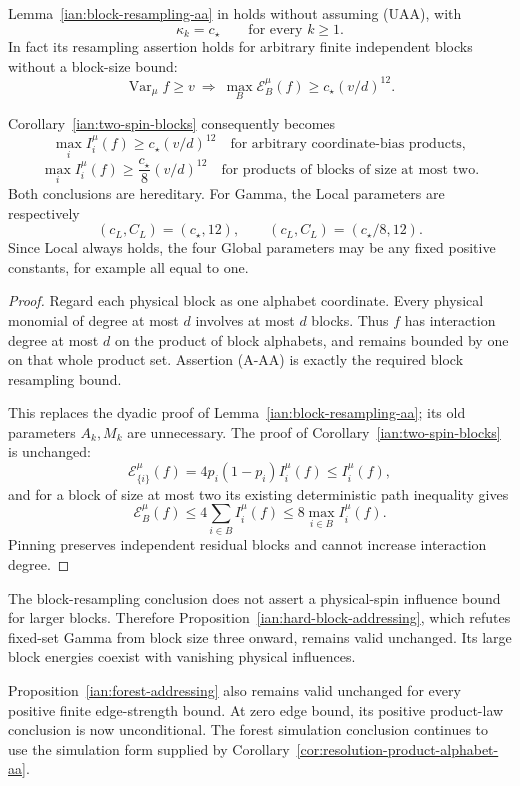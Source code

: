\begin{proposition}
\label{ian:influence-consequences-blocks}
Lemma~\ref{ian:block-resampling-aa} in
 holds without
assuming (UAA), with
\[
 \kappa_k=c_\star\qquad\text{for every }k\ge1.
\]
In fact its resampling assertion holds for arbitrary finite
independent blocks without a block-size bound:
\[
 \operatorname{Var}_\mu f\ge v
 \ \Longrightarrow\
 \max_B\mathcal E_B^\mu(f)\ge c_\star(v/d)^{12}.
\]

Corollary~\ref{ian:two-spin-blocks} consequently becomes
\[
 \max_i I_i^\mu(f)\ge c_\star(v/d)^{12}
 \quad\text{for arbitrary coordinate-bias products},
\]
\[
 \max_i I_i^\mu(f)\ge\frac{c_\star}{8}(v/d)^{12}
 \quad\text{for products of blocks of size at most two}.
\]
Both conclusions are hereditary. For Gamma, the Local parameters
are respectively
\[
 (c_L,C_L)=(c_\star,12),\qquad
 (c_L,C_L)=(c_\star/8,12).
\]
Since Local always holds, the four Global parameters may be any
fixed positive constants, for example all equal to one.
\end{proposition}

\begin{proof}
Regard each physical block as one alphabet coordinate.
Every physical monomial of degree at most \(d\) involves at most
\(d\) blocks. Thus \(f\) has interaction degree at most \(d\) on
the product of block alphabets, and remains bounded by one on that
whole product set. Assertion (A-AA) is exactly the required block
resampling bound.

This replaces the dyadic proof of
Lemma~\ref{ian:block-resampling-aa}; its old parameters
\(A_k,M_k\) are unnecessary. The proof of
Corollary~\ref{ian:two-spin-blocks} is unchanged:
\[
 \mathcal E_{\{i\}}^\mu(f)
 =4p_i(1-p_i)I_i^\mu(f)\le I_i^\mu(f),
\]
and for a block of size at most two its existing deterministic
path inequality gives
\[
 \mathcal E_B^\mu(f)\le4\sum_{i\in B}I_i^\mu(f)
 \le8\max_{i\in B}I_i^\mu(f).
\]
Pinning preserves independent residual blocks and cannot increase
interaction degree.
\end{proof}

\begin{remark}
\label{ian:influence-consequences-failures}
The block-resampling conclusion does not assert a physical-spin
influence bound for larger blocks. Therefore
Proposition~\ref{ian:hard-block-addressing}, which refutes fixed-set
Gamma from block size three onward, remains valid unchanged.
Its large block energies coexist with vanishing physical influences.

Proposition~\ref{ian:forest-addressing} also remains valid unchanged
for every positive finite edge-strength bound. At zero edge bound,
its positive product-law conclusion is now unconditional.
The forest simulation conclusion continues to use the simulation
form supplied by
Corollary~\ref{cor:resolution-product-alphabet-aa}.
\end{remark}

